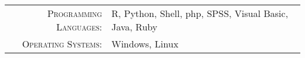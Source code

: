 \documentclass[localFont, alternative]{awesome-source-cv}
\begin{document}
\makecvheaderwithoutphoto


% 
% 
% 
%
\renewcommand{\arraystretch}{1.1}

	\begin{tabular}{>{}r>{}p{13cm}}
		\textsc{Programming Languages:}  		&
		R, Python, Shell, php, SPSS, Visual Basic, Java, Ruby\\
		\textsc{Operating Systems:}	        &   Windows, Linux\\
	\end{tabular}
%


\end{document}
